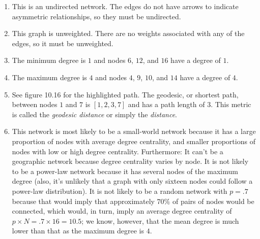 \documentclass{book}
\begin{document}
\begin{enumerate}
  \begin{enumerate}
  \def\labelenumii{\arabic{enumii}.}
  \item
    This is an undirected network. The edges do not have arrows to indicate
    asymmetric relationships, so they must be undirected.
  \item
    This graph is unweighted. There are no weights associated with any of the
    edges, so it must be unweighted.
  \item
    The minimum degree is \(1\) and nodes \(6\), \(12\), and \(16\) have a
    degree of \(1\).
  \item
    The maximum degree is \(4\) and nodes \(4\), \(9\), \(10\), and \(14\)
    have a degree of \(4\).
  \item
    See figure 10.16 for the highlighted path. The geodesic, or shortest path,
    between nodes \(1\) and \(7\) is \([1, 2, 3, 7]\) and has a path length of
    \(3\). This metric is called the \emph{geodesic distance} or simply the
    \emph{distance}.
  \item
    This network is most likely to be a small-world network because it has a
    large proportion of nodes with average degree centrality, and smaller
    proportions of nodes with low or high degree centrality. Furthermore: It
    can't be a geographic network because degree centrality varies by node. It
    is not likely to be a power-law network because it has several nodes of
    the maximum degree (also, it's unlikely that a graph with only sixteen
    nodes could follow a power-law distribution). It is not likely to be a
    random network with \(p = .7\) because that would imply that approximately
    \(70\%\) of pairs of nodes would be connected, which would, in turn, imply
    an average degree centrality of \(p \times N = .7 \times 16 = 10.5\); we
    know, however, that the mean degree is much lower than that as the maximum
    degree is \(4\).
  \end{enumerate}
\end{enumerate}
\end{document}
